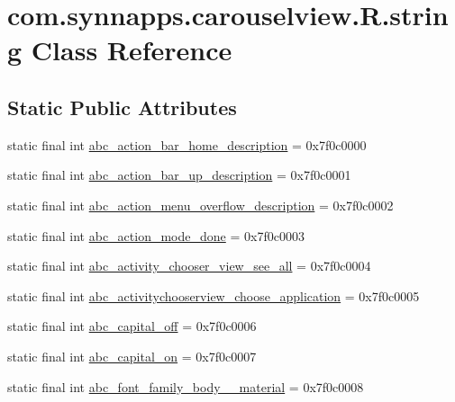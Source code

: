 \hypertarget{classcom_1_1synnapps_1_1carouselview_1_1_r_1_1string}{}\section{com.\+synnapps.\+carouselview.\+R.\+string Class Reference}
\label{classcom_1_1synnapps_1_1carouselview_1_1_r_1_1string}
\subsection*{Static Public Attributes}
\begin{DoxyCompactItemize}
\item 
static final int \mbox{\hyperlink{classcom_1_1synnapps_1_1carouselview_1_1_r_1_1string_af7c7223e4ccd7af640361c0093e23d01}{abc\+\_\+action\+\_\+bar\+\_\+home\+\_\+description}} = 0x7f0c0000
\item 
static final int \mbox{\hyperlink{classcom_1_1synnapps_1_1carouselview_1_1_r_1_1string_a50e9f4edf584310f0a56963495f8ff6b}{abc\+\_\+action\+\_\+bar\+\_\+up\+\_\+description}} = 0x7f0c0001
\item 
static final int \mbox{\hyperlink{classcom_1_1synnapps_1_1carouselview_1_1_r_1_1string_ac721908b3ec120c04744ec039b37449f}{abc\+\_\+action\+\_\+menu\+\_\+overflow\+\_\+description}} = 0x7f0c0002
\item 
static final int \mbox{\hyperlink{classcom_1_1synnapps_1_1carouselview_1_1_r_1_1string_aa6e056aacde7400ef3ce53301054433b}{abc\+\_\+action\+\_\+mode\+\_\+done}} = 0x7f0c0003
\item 
static final int \mbox{\hyperlink{classcom_1_1synnapps_1_1carouselview_1_1_r_1_1string_aa13f5d97be2f824f247eb9b791270194}{abc\+\_\+activity\+\_\+chooser\+\_\+view\+\_\+see\+\_\+all}} = 0x7f0c0004
\item 
static final int \mbox{\hyperlink{classcom_1_1synnapps_1_1carouselview_1_1_r_1_1string_a9783526c910e49b1d3e93245cd044644}{abc\+\_\+activitychooserview\+\_\+choose\+\_\+application}} = 0x7f0c0005
\item 
static final int \mbox{\hyperlink{classcom_1_1synnapps_1_1carouselview_1_1_r_1_1string_a441a292f6faa32155dfdf91317e3caa5}{abc\+\_\+capital\+\_\+off}} = 0x7f0c0006
\item 
static final int \mbox{\hyperlink{classcom_1_1synnapps_1_1carouselview_1_1_r_1_1string_aa0f83a77d9e695f1fc41df5f5bce450d}{abc\+\_\+capital\+\_\+on}} = 0x7f0c0007
\item 
static final int \mbox{\hyperlink{classcom_1_1synnapps_1_1carouselview_1_1_r_1_1string_a98cf646ecdc1443932ac538b33288cd7}{abc\+\_\+font\+\_\+family\+\_\+body\+\_\+\_\+material}} = 0x7f0c0008

\end{DoxyCompactItemize}
